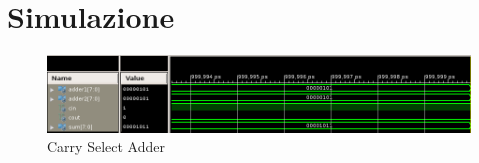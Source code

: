 %

\section{Simulazione}

\begin{figure}[H]
	\centering
\includegraphics[scale=0.55]{esercizio11/images/carry_select_testbench.png}
	\caption{Carry Select Adder}
\end{figure}%

